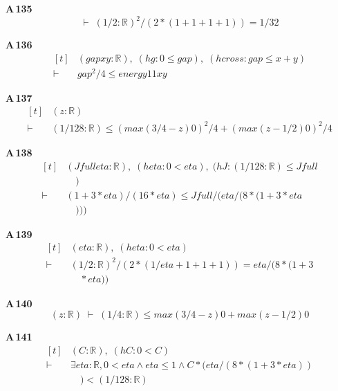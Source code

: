\noindent\textbf{A\,135}\quad{}
{\footnotesize\[ \vdash\; (1/2 : \mathbb{R} ) ^{2} / (2 * (1 + 1 + 1 + 1)) = 1 / 32 \]}

\noindent\textbf{A\,136}\quad{}
{\footnotesize\[ \begin{aligned}[t]
&(\mathit{gap} \mathit{x} \mathit{y} : \mathbb{R} ),\; (\mathit{hg} : 0 \leq \mathit{gap}),\; (\mathit{hcross} : \mathit{gap} \leq \mathit{x} + \mathit{y})\\
\vdash\;&\mathit{gap} ^{2} / 4 \leq \mathit{energy} 1 1 \mathit{x} \mathit{y}
\end{aligned} \]}

\noindent\textbf{A\,137}\quad{}
{\footnotesize\[ \begin{aligned}[t]
&(\mathit{z} : \mathbb{R} )\\
\vdash\;&(1/128 : \mathbb{R} ) \leq (\mathit{max} (3/4 - \mathit{z}) 0) ^{2} / 4 + (\mathit{max} (\mathit{z} - 1/2) 0) ^{2} / 4
\end{aligned} \]}

\noindent\textbf{A\,138}\quad{}
{\footnotesize\[ \begin{aligned}[t]
&(\mathit{Jfull} \mathit{eta} : \mathbb{R} ),\; (\mathit{heta} : 0 < \mathit{eta}),\; (\mathit{hJ} : (1/128 : \mathbb{R} ) \leq \mathit{Jfull}\\
&\quad )\\
\vdash\;&(1 + 3 * \mathit{eta}) / (16 * \mathit{eta}) \leq \mathit{Jfull} / (\mathit{eta} / (8 * (1 + 3 * \mathit{eta}\\
&\quad )))
\end{aligned} \]}

\noindent\textbf{A\,139}\quad{}
{\footnotesize\[ \begin{aligned}[t]
&(\mathit{eta} : \mathbb{R} ),\; (\mathit{heta} : 0 < \mathit{eta})\\
\vdash\;&(1/2 : \mathbb{R} ) ^{2} / (2 * (1/\mathit{eta} + 1 + 1 + 1)) = \mathit{eta} / (8 * (1 + 3\\
&\quad * \mathit{eta}))
\end{aligned} \]}

\noindent\textbf{A\,140}\quad{}
{\footnotesize\[ (\mathit{z} : \mathbb{R} ) \;\vdash\; (1/4 : \mathbb{R} ) \leq \mathit{max} (3/4 - \mathit{z}) 0 + \mathit{max} (\mathit{z} - 1/2) 0 \]}

\noindent\textbf{A\,141}\quad{}
{\footnotesize\[ \begin{aligned}[t]
&(\mathit{C} : \mathbb{R} ),\; (\mathit{hC} : 0 < \mathit{C})\\
\vdash\;&\exists \mathit{eta} : \mathbb{R} , 0 < \mathit{eta} \wedge \mathit{eta} \leq 1 \wedge \mathit{C} * (\mathit{eta} / (8 * (1 + 3 * \mathit{eta}))\\
&\quad ) < (1 / 128 : \mathbb{R} )
\end{aligned} \]}

